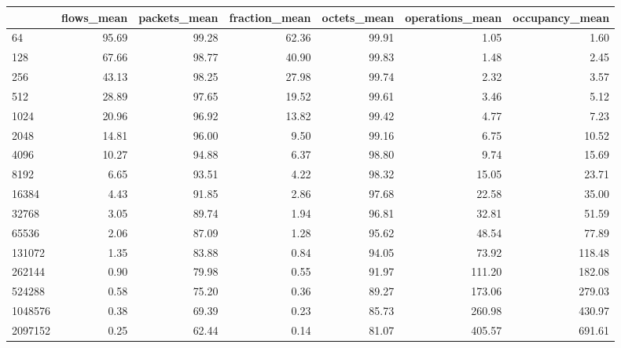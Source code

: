 \begin{tabular}{lrrrrrr}
\toprule
{} &  flows\_mean &  packets\_mean &  fraction\_mean &  octets\_mean &  operations\_mean &  occupancy\_mean \\
\midrule
64         &       95.69 &         99.28 &          62.36 &        99.91 &             1.05 &            1.60 \\
128        &       67.66 &         98.77 &          40.90 &        99.83 &             1.48 &            2.45 \\
256        &       43.13 &         98.25 &          27.98 &        99.74 &             2.32 &            3.57 \\
512        &       28.89 &         97.65 &          19.52 &        99.61 &             3.46 &            5.12 \\
1024       &       20.96 &         96.92 &          13.82 &        99.42 &             4.77 &            7.23 \\
2048       &       14.81 &         96.00 &           9.50 &        99.16 &             6.75 &           10.52 \\
4096       &       10.27 &         94.88 &           6.37 &        98.80 &             9.74 &           15.69 \\
8192       &        6.65 &         93.51 &           4.22 &        98.32 &            15.05 &           23.71 \\
16384      &        4.43 &         91.85 &           2.86 &        97.68 &            22.58 &           35.00 \\
32768      &        3.05 &         89.74 &           1.94 &        96.81 &            32.81 &           51.59 \\
65536      &        2.06 &         87.09 &           1.28 &        95.62 &            48.54 &           77.89 \\
131072     &        1.35 &         83.88 &           0.84 &        94.05 &            73.92 &          118.48 \\
262144     &        0.90 &         79.98 &           0.55 &        91.97 &           111.20 &          182.08 \\
524288     &        0.58 &         75.20 &           0.36 &        89.27 &           173.06 &          279.03 \\
1048576    &        0.38 &         69.39 &           0.23 &        85.73 &           260.98 &          430.97 \\
2097152    &        0.25 &         62.44 &           0.14 &        81.07 &           405.57 &          691.61 \\

\end{tabular}

